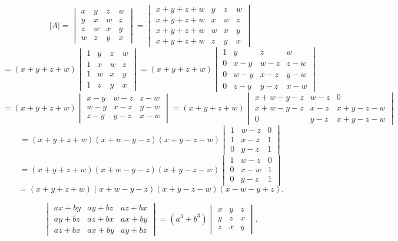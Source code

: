 \begin{example}
\[
|A|=\begin{vmatrix}
x&y&z&w\\
y&x&w&z\\
z&w&x&y\\
w&z&y&x
\end{vmatrix}
=\begin{vmatrix}
x+y+z+w&y&z&w\\
x+y+z+w&x&w&z\\
x+y+z+w&w&x&y\\
x+y+z+w&z&y&x
\end{vmatrix}
\]
\[
=(x+y+z+w)\begin{vmatrix}
1&y&z&w\\
1&x&w&z\\
1&w&x&y\\
1&z&y&x
\end{vmatrix}
=(x+y+z+w)\begin{vmatrix}
1&y&z&w\\
0&x-y&w-z&z-w\\
0&w-y&x-z&y-w\\
0&z-y&y-z&x-w
\end{vmatrix}
\]
\[
=(x+y+z+w)\begin{vmatrix}
x-y&w-z&z-w\\
w-y&x-z&y-w\\
z-y&y-z&x-w
\end{vmatrix}
=(x+y+z+w)\begin{vmatrix}
x+w-y-z&w-z&0\\
x+w-y-z&x-z&x+y-z-w\\
0&y-z&x+y-z-w
\end{vmatrix}
\]
\[
=(x+y+z+w)(x+w-y-z)(x+y-z-w)\begin{vmatrix}
1&w-z&0\\
1&x-z&1\\
0&y-z&1
\end{vmatrix}
\]
\[
=(x+y+z+w)(x+w-y-z)(x+y-z-w)\begin{vmatrix}
1&w-z&0\\
0&x-w&1\\
0&y-z&1
\end{vmatrix}
\]
\[
=(x+y+z+w)(x+w-y-z)(x+y-z-w)(x-w-y+z).
\]
\end{example}

\begin{example}[拆分法]
\[
\begin{vmatrix}
ax+by&ay+bz&az+bx\\
ay+bz&az+bx&ax+by\\
az+bx&ax+by&ay+bz
\end{vmatrix}
=(a^3+b^3)\begin{vmatrix}
x&y&z\\
y&z&x\\
z&x&y
\end{vmatrix}.
\]
\end{example}

